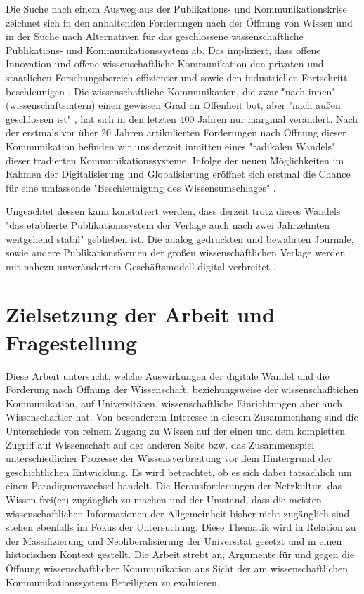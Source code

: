 Die Suche nach einem Ausweg aus der Publikations- und Kommunikationskrise zeichnet sich in den anhaltenden Forderungen nach der Öffnung von Wissen und in der Suche nach Alternativen für das geschlossene wissenschaftliche Publikations- und Kommunikationssystem ab. Das impliziert, dass offene Innovation und offene wissenschaftliche Kommunikation den privaten und staatlichen Forschungsbereich effizienter und sowie den industriellen Fortschritt beschleunigen \cite{cite:7}. 
Die wissenschaftliche Kommunikation, die zwar "nach innen" (wissenschaftsintern) einen gewissen Grad an Offenheit bot, aber "nach außen geschlossen ist" \cite{kelty_2004}, hat sich in den letzten 400 Jahren nur marginal verändert.
Nach der erstmals vor über 20 Jahren artikulierten Forderungen nach Öffnung dieser Kommunikation befinden wir uns derzeit inmitten eines "radikalen Wandels" \cite{poynder_2011_suber} dieser tradierten Kommunikationssysteme. Infolge der neuen Möglichkeiten im Rahmen der Digitalisierung und Globalisierung \cite{mcluhan_1963_gutenberg} eröffnet sich erstmal die Chance für eine umfassende "Beschleunigung des Wissensumschlages" \cite{Wenzel_2003}.

Ungeachtet dessen kann konstatiert werden, dass derzeit trotz dieses Wandels "das etablierte Publikationssystem der Verlage auch nach zwei Jahrzehnten weitgehend stabil" \cite{Hanekop_2014} geblieben ist. Die analog gedruckten und bewährten Journale, sowie andere Publikationsformen der großen wissenschaftlichen Verlage werden mit nahezu unverändertem Geschäftsmodell digital verbreitet \cite{Hanekop_2014} \cite{boai_2012}.

\section{Zielsetzung der Arbeit und Fragestellung} 

Diese Arbeit untersucht, welche Auswirkungen der digitale Wandel und die Forderung nach Öffnung der Wissenschaft, beziehungsweise der wissenschafltichen Kommunikation, auf Universitäten, wissenschaftliche Einrichtungen aber auch Wissenschaftler hat. Von besonderem Interesse in diesem Zusammenhang sind die Unterschiede von reinem Zugang zu Wissen auf der einen und dem kompletten Zugriff auf Wissenschaft auf der anderen Seite bzw. das Zusammenspiel unterschiedlicher Prozesse der Wissensverbreitung vor dem Hintergrund der geschichtlichen Entwicklung. Es wird betrachtet, ob es sich dabei tatsächlich um einen Paradigmenwechsel handelt. Die Herausforderungen der Netzkultur, das Wissen frei(er) zugänglich zu machen und der Umstand, dass die meisten wissenschaftlichen Informationen der Allgemeinheit bisher nicht zugänglich sind \cite{cite:6} stehen ebenfalls im Fokus der Untersuchung. Diese Thematik wird in Relation zu der Massifizierung und Neoliberalisierung der Universität gesetzt und in einen historischen Kontext gestellt. Die Arbeit strebt an, Argumente für und gegen die Öffnung wissenschaftlicher Kommunikation aus Sicht der am wissenschaftlichen Kommunikationssystem Beteiligten zu evaluieren.

